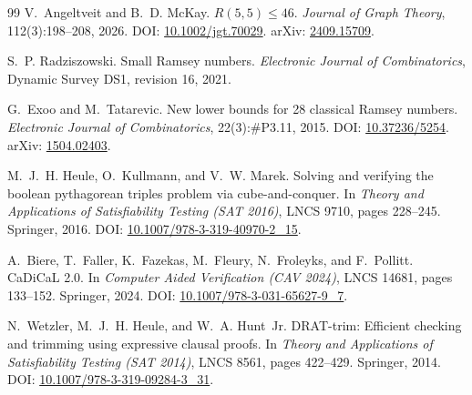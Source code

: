 \documentclass[11pt,a4paper]{article}
\theoremstyle{definition}
\begin{document}
\begin{thebibliography}{99}
V.~Angeltveit and B.~D. McKay.
\newblock $R(5,5) \le 46$.
\newblock \emph{Journal of Graph Theory}, 112(3):198--208, 2026.
\newblock DOI: \href{https://doi.org/10.1002/jgt.70029}{10.1002/jgt.70029}.
\newblock arXiv: \href{https://arxiv.org/abs/2409.15709}{2409.15709}.

S.~P. Radziszowski.
\newblock Small Ramsey numbers.
\newblock \emph{Electronic Journal of Combinatorics}, Dynamic Survey DS1, revision 16, 2021.

G.~Exoo and M.~Tatarevic.
\newblock New lower bounds for 28 classical Ramsey numbers.
\newblock \emph{Electronic Journal of Combinatorics}, 22(3):\#P3.11, 2015.
\newblock DOI: \href{https://doi.org/10.37236/5254}{10.37236/5254}.
\newblock arXiv: \href{https://arxiv.org/abs/1504.02403}{1504.02403}.

M.~J.~H. Heule, O.~Kullmann, and V.~W. Marek.
\newblock Solving and verifying the boolean pythagorean triples problem via cube-and-conquer.
\newblock In \emph{Theory and Applications of Satisfiability Testing (SAT 2016)}, LNCS 9710, pages 228--245. Springer, 2016.
\newblock DOI: \href{https://doi.org/10.1007/978-3-319-40970-2_15}{10.1007/978-3-319-40970-2\_15}.

A.~Biere, T.~Faller, K.~Fazekas, M.~Fleury, N.~Froleyks, and F.~Pollitt.
\newblock CaDiCaL 2.0.
\newblock In \emph{Computer Aided Verification (CAV 2024)}, LNCS 14681, pages 133--152. Springer, 2024.
\newblock DOI: \href{https://doi.org/10.1007/978-3-031-65627-9_7}{10.1007/978-3-031-65627-9\_7}.

N.~Wetzler, M.~J.~H. Heule, and W.~A. Hunt~Jr.
\newblock DRAT-trim: Efficient checking and trimming using expressive clausal proofs.
\newblock In \emph{Theory and Applications of Satisfiability Testing (SAT 2014)}, LNCS 8561, pages 422--429. Springer, 2014.
\newblock DOI: \href{https://doi.org/10.1007/978-3-319-09284-3_31}{10.1007/978-3-319-09284-3\_31}.

\end{thebibliography}
\end{document}
